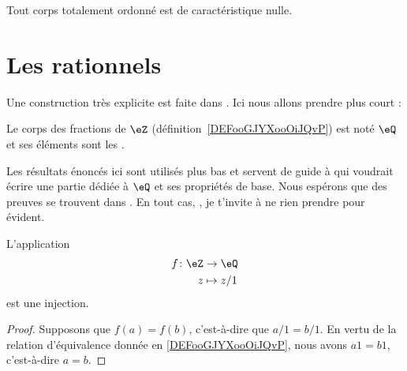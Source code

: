 \begin{lemma}       \label{LEMooVZNCooRJatKK}
	Tout corps totalement ordonné est de caractéristique nulle.
\end{lemma}

\section{Les rationnels}

Une construction très explicite est faite dans \cite{RWWJooJdjxEK}. Ici nous allons prendre plus court :
\begin{definition}
	Le corps des fractions de \( \eZ\) (définition~\ref{DEFooGJYXooOiJQvP}) est noté \( \eQ\) et ses éléments sont les .
\end{definition}

\begin{normaltext}
	Les résultats énoncés ici sont utilisés plus bas et servent de guide à  qui voudrait écrire une partie dédiée à \( \eQ\) et ses propriétés de base. Nous espérons que des preuves se trouvent dans \cite{RWWJooJdjxEK}. En tout cas, , je t'invite à ne rien prendre pour évident.
\end{normaltext}

\begin{proposition}     \label{PROPooUULNooKbwuEw}
	L'application
	\begin{equation}
		\begin{aligned}
			f\colon \eZ & \to \eQ     \\
			z           & \mapsto z/1
		\end{aligned}
	\end{equation}
	est une injection.
\end{proposition}

\begin{proof}
	Supposons que \( f(a)=f(b)\), c'est-à-dire que \( a/1=b/1\). En vertu de la relation d'équivalence donnée en \ref{DEFooGJYXooOiJQvP}, nous avons \( a1=b1\), c'est-à-dire \( a=b\).
\end{proof}

